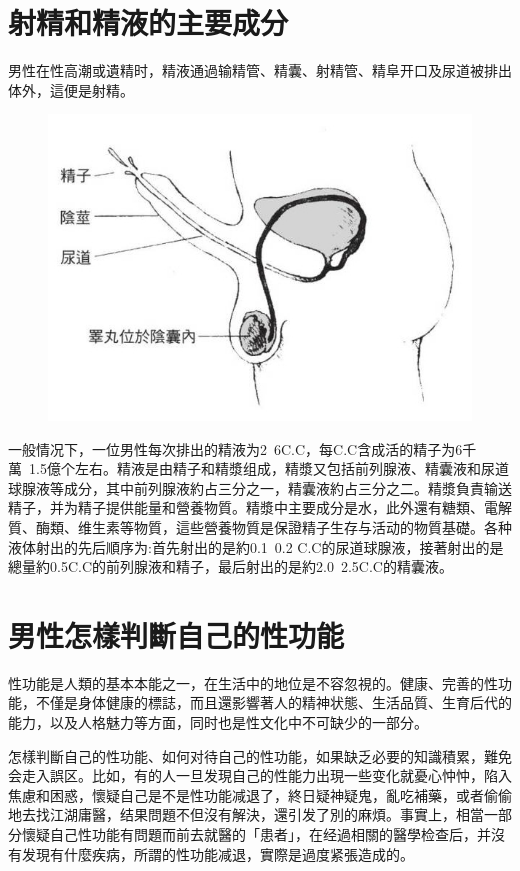 \documentclass[12pt,UTF8]{ctexbook}
\begin{document}
\section{射精和精液的主要成分}

男性在性高潮或遺精时，精液通過输精管、精囊、射精管、精阜开口及尿道被排出体外，這便是射精。

\begin{figure}[htbp]
	\centering
	\includegraphics[width=0.7\linewidth]{5}
	\caption{}
\end{figure}

一般情况下，一位男性每次排出的精液为2~6C.C，每C.C含成活的精子为6千萬~1.5億个左右。精液是由精子和精漿组成，精漿又包括前列腺液、精囊液和尿道球腺液等成分，其中前列腺液約占三分之一，精囊液約占三分之二。精漿負責输送精子，并为精子提供能量和營養物質。精漿中主要成分是水，此外還有糖類、電解質、酶類、维生素等物質，這些營養物質是保證精子生存与活动的物質基礎。各种液体射出的先后順序为:首先射出的是約0.1~0.2 C.C的尿道球腺液，接著射出的是總量約0.5C.C的前列腺液和精子，最后射出的是約2.0~2.5C.C的精囊液。

\section{男性怎樣判斷自己的性功能}

性功能是人類的基本本能之一，在生活中的地位是不容忽視的。健康、完善的性功能，不僅是身体健康的標誌，而且還影響著人的精神状態、生活品質、生育后代的能力，以及人格魅力等方面，同时也是性文化中不可缺少的一部分。

怎樣判斷自己的性功能、如何对待自己的性功能，如果缺乏必要的知識積累，難免会走入誤区。比如，有的人一旦发現自己的性能力出現一些变化就憂心忡忡，陷入焦慮和困惑，懷疑自己是不是性功能减退了，終日疑神疑鬼，亂吃補藥，或者偷偷地去找江湖庸醫，结果問題不但沒有解決，還引发了別的麻煩。事實上，相當一部分懷疑自己性功能有問題而前去就醫的「患者」，在经過相關的醫學检查后，并沒有发現有什麼疾病，所謂的性功能减退，實際是過度紧張造成的。
\end{document}
